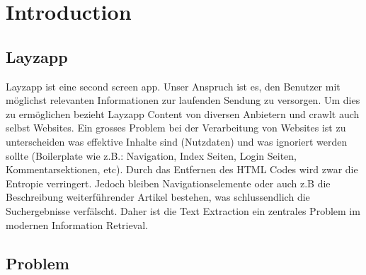 
\chapter{Introduction} %

\label{Chapter1} %



\section{Layzapp}

Layzapp ist eine second screen app. Unser Anspruch ist es, den Benutzer mit möglichst relevanten Informationen zur laufenden Sendung zu versorgen. Um dies zu ermöglichen bezieht Layzapp Content von diversen Anbietern und crawlt auch selbst Websites. Ein grosses Problem bei der Verarbeitung von Websites ist zu unterscheiden was effektive Inhalte sind (Nutzdaten) und was ignoriert werden sollte (Boilerplate  wie z.B.: Navigation, Index Seiten, Login Seiten, Kommentarsektionen, etc). Durch das Entfernen des HTML Codes wird zwar die Entropie verringert. Jedoch bleiben Navigationselemente oder auch z.B die Beschreibung weiterführender Artikel bestehen, was schlussendlich die Suchergebnisse verfälscht. Daher ist die Text Extraction ein zentrales Problem im modernen Information Retrieval.


\section{Problem}

